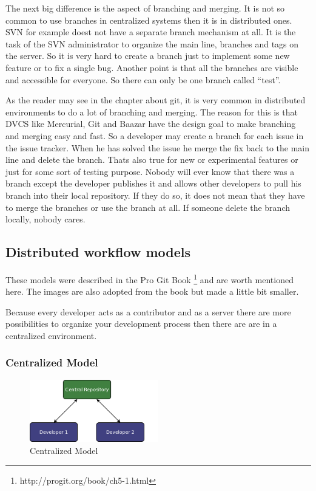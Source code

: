 The next big difference is the aspect of branching and merging. It is not so common to use branches 
in centralized systems then it is in distributed ones. SVN for example doest not have a separate branch 
mechanism at all.
It is the task of the SVN administrator to organize the main line, branches and tags on the server. 
So it is very hard to create a branch just to implement some new feature or to fix a single bug. Another 
point is that all the branches are visible and accessible for everyone. So there can only 
be one branch called “test”.

As the reader may see in the chapter about git, it is very common in distributed environments to 
do a lot of branching and merging. The reason for this is that DVCS like Mercurial, Git and Baazar 
have the design goal to make branching and merging easy and fast. So a developer may create a branch 
for each issue in the issue tracker. When he has solved the issue he merge the fix back to the main 
line and delete the branch. Thats also true for new or experimental features or just for some sort 
of testing purpose. Nobody will ever know that there was a branch except the developer publishes 
it and allows other developers to pull his branch into their local repository. If they do so, it 
does not mean that they have to merge the branches or use the branch at all. If someone delete 
the branch locally, nobody cares.


\subsection{Distributed workflow models}

These models were described in the Pro Git Book \footnote{http://progit.org/book/ch5-1.html} and are 
worth mentioned here. The images are also adopted from the book but made a little bit smaller.

Because every developer acts as a contributor and as a server there are more possibilities to organize 
your development process then there are are in a centralized environment.


\subsubsection{Centralized Model}

\begin{figure}[ht]
  \centering
  \includegraphics[width=0.5\textwidth]{img/Mod_Central}
  \caption{Centralized Model}
  \label{fig:mod_centralized} 
\end{figure}

